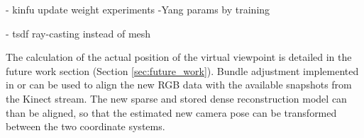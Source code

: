 \documentclass{ucl_thesis}
\newcommand{\secref}[1]{(Section \ref{#1})}
\begin{document}
- kinfu update weight experiments
-Yang params by training

- tsdf ray-casting instead of mesh

\par The calculation of the actual position of the virtual viewpoint is detailed in the future work section \secref{sec:future_work}. Bundle adjustment implemented in \citep{SnavelySS06} or \citep{vsfm} can be used to align the new RGB data with the available snapshots from the Kinect stream. The new sparse and stored dense reconstruction model can than be aligned, so that the estimated new camera pose can be transformed between the two coordinate systems.


\end{document}
